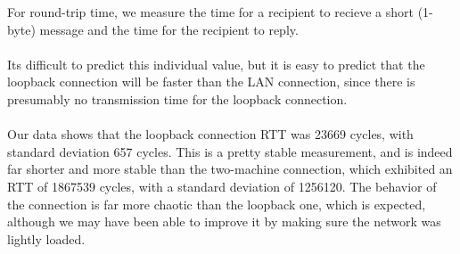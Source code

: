 \noindent For round-trip time, we measure the time for a recipient to recieve a short (1-byte) message and the time for the recipient to reply. 
\\
\\
Its difficult to predict this individual value, but it is easy to predict that the loopback connection will be faster than the LAN connection, since there is presumably no transmission time for the loopback connection.
\\
\\
Our data shows that the loopback connection RTT was 23669 cycles, with standard deviation 657 cycles. This is a pretty stable measurement, and is indeed far shorter and more stable than the two-machine connection, which exhibited an RTT of 1867539 cycles, with a standard deviation of 1256120. The behavior of the connection is far more chaotic than the loopback one, which is expected, although we may have been able to improve it by making sure the network was lightly loaded.